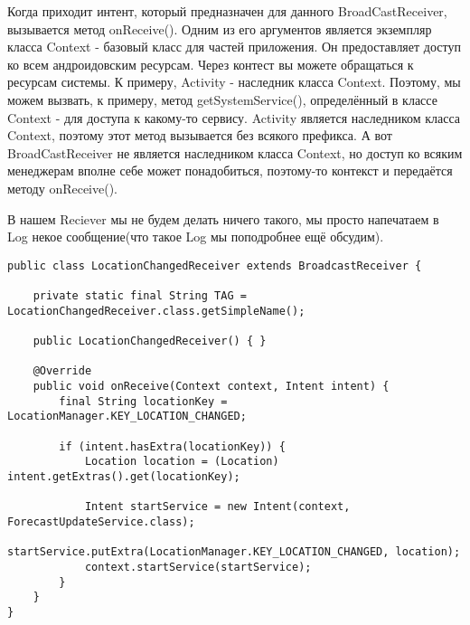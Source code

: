 \documentclass[12 pt]{article}
\begin{document}
    Когда приходит интент, который предназначен для данного BroadCastReceiver, вызывается метод onReceive(). Одним из его аргументов является экземпляр класса Context - базовый класс для частей приложения. Он предоставляет доступ ко всем андроидовским ресурсам. Через контест вы можете обращаться к ресурсам системы. К примеру, Activity - наследник класса Context. Поэтому, мы можем вызвать, к примеру, метод getSystemService(), определённый в классе Context - для доступа к какому-то сервису. Activity является наследником класса Context, поэтому этот метод вызывается без всякого префикса. А вот BroadCastReceiver не является наследником класса Context, но доступ ко всяким менеджерам вполне себе может понадобиться, поэтому-то контекст и передаётся методу onReceive(). 
    
        В нашем Reciever мы не будем делать ничего такого, мы просто напечатаем в Log некое сообщение(что такое Log мы поподробнее ещё обсудим). 
        
        \begin{lstlisting}
public class LocationChangedReceiver extends BroadcastReceiver {

    private static final String TAG = LocationChangedReceiver.class.getSimpleName();

    public LocationChangedReceiver() { }

    @Override
    public void onReceive(Context context, Intent intent) {
        final String locationKey = LocationManager.KEY_LOCATION_CHANGED;

        if (intent.hasExtra(locationKey)) {
            Location location = (Location) intent.getExtras().get(locationKey);

            Intent startService = new Intent(context, ForecastUpdateService.class);
            startService.putExtra(LocationManager.KEY_LOCATION_CHANGED, location);
            context.startService(startService);
        }
    }
}
    \end{lstlisting}
    
\end{document}
